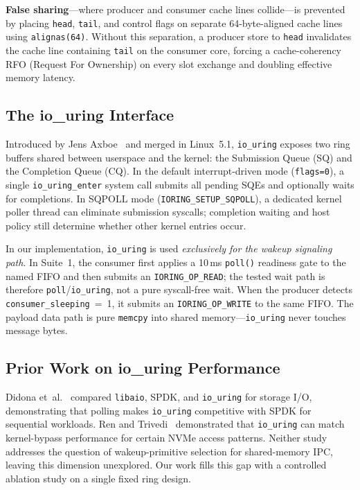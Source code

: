 \documentclass[10pt,conference]{IEEEtran}
\begin{document}
\textbf{False sharing}---where producer and consumer cache lines collide---is
prevented by placing \texttt{head}, \texttt{tail}, and control flags on
separate 64-byte-aligned cache lines using \texttt{alignas(64)}.  Without this
separation, a producer store to \texttt{head} invalidates the cache line
containing \texttt{tail} on the consumer core, forcing a cache-coherency
RFO (Request For Ownership) on every slot exchange and doubling effective
memory latency.

\subsection{The io\_uring Interface}

Introduced by Jens Axboe~\cite{axboe2019} and merged in Linux~5.1,
\texttt{io\_uring} exposes two ring buffers shared between userspace and the
kernel: the Submission Queue (SQ) and the Completion Queue (CQ).  In the
default interrupt-driven mode (\texttt{flags=0}), a single
\texttt{io\_uring\_enter} system call submits all pending SQEs and optionally
waits for completions.  In SQPOLL mode (\texttt{IORING\_SETUP\_SQPOLL}), a
dedicated kernel poller thread can eliminate submission syscalls; completion
waiting and host policy still determine whether other kernel entries occur.

In our implementation, \texttt{io\_uring} is used \emph{exclusively for the
wakeup signaling path}.  In Suite~1, the consumer first applies a 10\,ms
\texttt{poll()} readiness gate to the named FIFO and then submits an
\texttt{IORING\_OP\_READ}; the tested wait path is therefore
\texttt{poll}/\texttt{io\_uring}, not a pure syscall-free wait.  When the producer detects
\texttt{consumer\_sleeping}~=~1, it submits an \texttt{IORING\_OP\_WRITE} to
the same FIFO.  The payload data path is pure \texttt{memcpy} into shared
memory---\texttt{io\_uring} never touches message bytes.

\subsection{Prior Work on io\_uring Performance}

Didona et~al.~\cite{didona2022} compared \texttt{libaio}, SPDK, and
\texttt{io\_uring} for storage I/O, demonstrating that polling makes \texttt{io\_uring}
competitive with SPDK for sequential workloads.  Ren and Trivedi~\cite{ren2023} demonstrated
that \texttt{io\_uring} can match kernel-bypass performance for certain NVMe
access patterns.  Neither study addresses the question of wakeup-primitive
selection for shared-memory IPC, leaving this dimension unexplored.  Our work
fills this gap with a controlled ablation study on a single fixed ring design.
\end{document}
